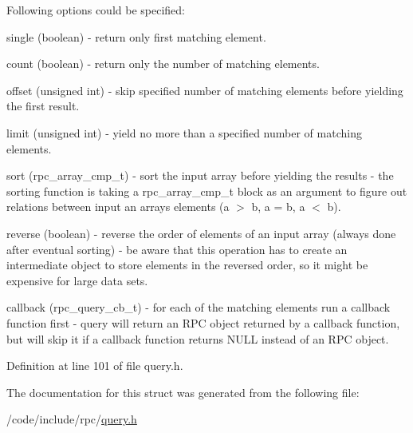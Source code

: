Following options could be specified\+:
\begin{DoxyItemize}
\item single (boolean) -\/ return only first matching element.
\item count (boolean) -\/ return only the number of matching elements.
\item offset (unsigned int) -\/ skip specified number of matching elements before yielding the first result.
\item limit (unsigned int) -\/ yield no more than a specified number of matching elements.
\item sort (rpc\+\_\+array\+\_\+cmp\+\_\+t) -\/ sort the input array before yielding the results -\/ the sorting function is taking a rpc\+\_\+array\+\_\+cmp\+\_\+t block as an argument to figure out relations between input an array\textquotesingle{}s elements (a $>$ b, a = b, a $<$ b).
\item reverse (boolean) -\/ reverse the order of elements of an input array (always done after eventual sorting) -\/ be aware that this operation has to create an intermediate object to store elements in the reversed order, so it might be expensive for large data sets.
\item callback (rpc\+\_\+query\+\_\+cb\+\_\+t) -\/ for each of the matching elements run a callback function first -\/ query will return an R\+PC object returned by a callback function, but will skip it if a callback function returns N\+U\+LL instead of an R\+PC object. 
\end{DoxyItemize}

Definition at line 101 of file query.\+h.



The documentation for this struct was generated from the following file\+:\begin{DoxyCompactItemize}
\item 
/code/include/rpc/\hyperlink{query_8h}{query.\+h}\end{DoxyCompactItemize}
